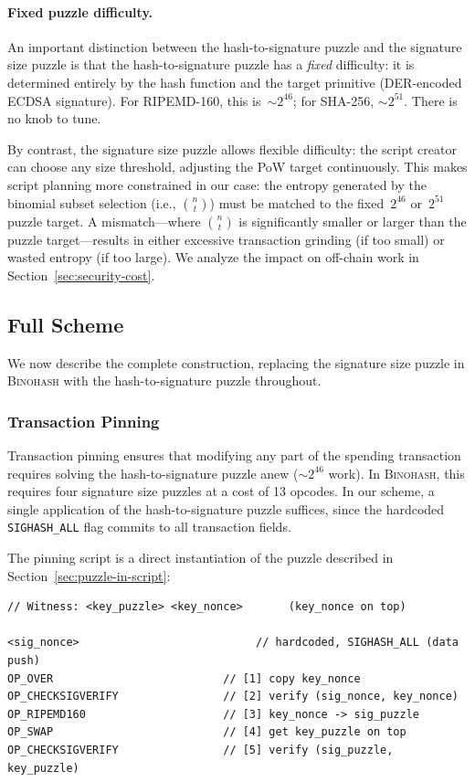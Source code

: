 \documentclass[11pt, a4paper]{article}
\begin{document}
\paragraph{Fixed puzzle difficulty.}
An important distinction between the hash-to-signature puzzle and the signature size puzzle is that the hash-to-signature puzzle has a \emph{fixed} difficulty: it is determined entirely by the hash function and the target primitive (DER-encoded ECDSA signature). For RIPEMD-160, this is~${\sim}2^{46}$; for SHA-256, ${\sim}2^{51}$. There is no knob to tune.

By contrast, the signature size puzzle allows flexible difficulty: the script creator can choose any size threshold, adjusting the PoW target continuously. This makes script planning more constrained in our case: the entropy generated by the binomial subset selection (i.e., $\binom{n}{t}$) must be matched to the fixed~$2^{46}$ or~$2^{51}$ puzzle target. A mismatch---where $\binom{n}{t}$ is significantly smaller or larger than the puzzle target---results in either excessive transaction grinding (if too small) or wasted entropy (if too large). We analyze the impact on off-chain work in Section~\ref{sec:security-cost}.

\subsection{Full Scheme}
\label{sec:full-scheme}

We now describe the complete construction, replacing the signature size puzzle in \textsc{Binohash} with the hash-to-signature puzzle throughout.

\subsubsection{Transaction Pinning}
\label{sec:qs-pinning}

Transaction pinning ensures that modifying any part of the spending transaction requires solving the hash-to-signature puzzle anew (${\sim}2^{46}$ work). In \textsc{Binohash}, this requires four signature size puzzles at a cost of 13 opcodes. In our scheme, a single application of the hash-to-signature puzzle suffices, since the hardcoded \texttt{SIGHASH\_ALL} flag commits to all transaction fields.

The pinning script is a direct instantiation of the puzzle described in Section~\ref{sec:puzzle-in-script}:

\begin{lstlisting}[language={}, numbers=none]
// Witness: <key_puzzle> <key_nonce>       (key_nonce on top)

<sig_nonce>                           // hardcoded, SIGHASH_ALL (data push)
OP_OVER                          // [1] copy key_nonce
OP_CHECKSIGVERIFY                // [2] verify (sig_nonce, key_nonce)
OP_RIPEMD160                     // [3] key_nonce -> sig_puzzle
OP_SWAP                          // [4] get key_puzzle on top
OP_CHECKSIGVERIFY                // [5] verify (sig_puzzle, key_puzzle)
\end{lstlisting}
\end{document}
